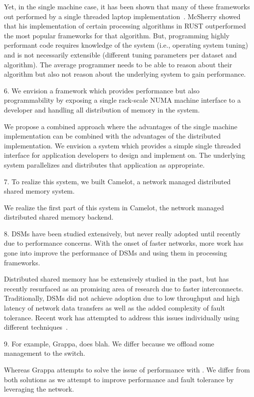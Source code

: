 Yet, in the single machine case, it has been shown that
many of these frameworks out performed by a single threaded laptop
implementation~\cite{COST}. McSherry showed that his implementation of certain
processing algorithms in RUST outperformed the most popular frameworks for that
algorithm. But, programming highly performant code requires knowledge of the
system (i.e., operating system tuning) and is not necessarily extensible 
(different tuning parameters per dataset and algorithm). The average programmer
needs to be able to reason about their algorithm but also not reason
about the underlying system to gain performance. 

\ac{6. We envision a framework which provides performance but also
	programmability by exposing a single rack-scale NUMA machine interface to a
	developer and handling all distribution of memory in the system.}

We propose a combined approach where the advantages of the single machine
implementation can be combined with the advantages of the distributed
implementation. We envision a system which provides a simple single threaded
interface for application developers to design and implement on. The underlying
system parallelizes and distributes that application as appropriate. 

\ac{7. To realize this system, we built Camelot, a network managed distributed
	shared memory system.}

We realize
the first part of this system in Camelot, the network managed distributed shared
memory backend. 

\ac{8. DSMs have been studied extensively, but never really adopted until
	recently due to performance concerns. With the onset of faster networks, more
	work has gone into improve the performance of DSMs and using them in processing
	frameworks. }

Distributed shared memory has be extensively studied in the past, but has
recently resurfaced as an promising area of research due to faster
interconnects. Traditionally, DSMs did not achieve adoption due to low
throughput and high latency of network data transfers as well as the added
complexity of fault tolerance. Recent work has attempted to address this issues
individually using different techniques~\cite{Ongaro2011,Nelson2015}.

\ac{9. For example, Grappa, does blah. We differ because we offload some
	management to the switch.}

Whereas Grappa attempts to solve the issue of performance
with . 
We differ from both solutions as we attempt to improve
performance and fault tolerance by leveraging the network. 

